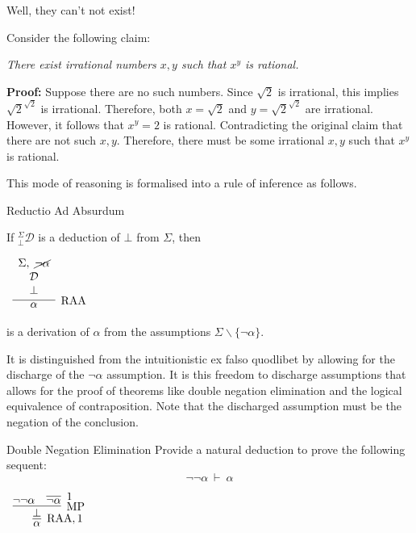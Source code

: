 \documentclass{book}
\begin{document}
    \begin{eg}{Well, they can't not exist!}

        Consider the following claim:

        \begin{center}
            \emph{There exist irrational numbers $x,y$ such that $x^{y}$ is rational.}
        \end{center}
        
        {\bf Proof:} Suppose there are no such numbers. Since $\sqrt{2}$ is irrational, this implies $\sqrt{2}^{\sqrt{2}}$ is irrational. Therefore, both $x = \sqrt{2}$ and $y = \sqrt{2}^{\sqrt{2}}$ are irrational. However, it follows that $x^{y} = 2$ is rational. Contradicting the original claim that there are not such $x,y$. Therefore, there must be some irrational $x,y$ such that $x^{y}$ is rational. 
    \end{eg}

    This mode of reasoning is formalised into a rule of inference as follows. 

    \begin{definition}{Reductio Ad Absurdum}

        If $^{\Sigma}_{\bot}\mathcal{D}$ is a deduction of $\bot$ from $\Sigma$, then

        \begin{center}		
            $\begin{array}{c}		
            \infer[\RAA]{\alpha}
            {\begin{array}{c} \Sigma, \ \cancel{\lnot\alpha} \\ \mathcal{D} \\ \bot \end{array}}
            \end{array}$
        \end{center}  

        is a derivation of $\alpha$ from the assumptions $\Sigma \backslash\{\lnot\alpha\}$.
    \end{definition}

    It is distinguished from the intuitionistic ex falso quodlibet by allowing for the discharge of the $\lnot\alpha$ assumption. It is this freedom to discharge assumptions that allows for the proof of theorems like double negation elimination and the logical equivalence of contraposition. Note that the discharged assumption must be the negation of the conclusion. 

    \begin{eg}{Double Negation Elimination}
        Provide a natural deduction to prove the following sequent: $$\lnot\lnot\alpha \ \vdash \ \alpha$$

        \begin{center}
            $\begin{array}{c}
                \infer[\RAA,1]{\alpha}
                    {\infer[\MP]{\bot}
                        {\lnot\lnot \alpha
                        &
                        \infer[1]{\lnot\alpha}{}}}
            \end{array}$
        \end{center}
    \end{eg}
\end{document}
